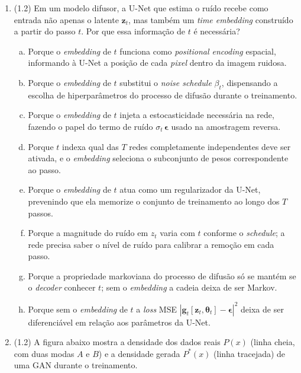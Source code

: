 \documentclass[11pt,a4paper]{article}
\newcommand{\thetav}{\boldsymbol{\theta}}
\begin{document}
\begin{enumerate}[1)]
\item (1.2) Em um modelo difusor, a U-Net que estima o ruído recebe como entrada não apenas o latente $\mathbf{z}_t$, mas também um \textit{time embedding} construído a partir do passo $t$. Por que essa informação de $t$ é necessária?
\begin{enumerate}[a)]
    \item Porque o \textit{embedding} de $t$ funciona como \textit{positional encoding} espacial, informando à U-Net a posição de cada \textit{pixel} dentro da imagem ruidosa.
    \item Porque o \textit{embedding} de $t$ substitui o \textit{noise schedule} $\beta_t$, dispensando a escolha de hiperparâmetros do processo de difusão durante o treinamento.
    \item Porque o \textit{embedding} de $t$ injeta a estocasticidade necessária na rede, fazendo o papel do termo de ruído $\sigma_t\,\boldsymbol{\epsilon}$ usado na amostragem reversa.
    \item Porque $t$ indexa qual das $T$ redes completamente independentes deve ser ativada, e o \textit{embedding} seleciona o subconjunto de pesos correspondente ao passo.
    \item Porque o \textit{embedding} de $t$ atua como um regularizador da U-Net, prevenindo que ela memorize o conjunto de treinamento ao longo dos $T$ passos.
    \item Porque a magnitude do ruído em $z_t$ varia com $t$ conforme o \textit{schedule}; a rede precisa saber o nível de ruído para calibrar a remoção em cada passo.
    \item Porque a propriedade markoviana do processo de difusão só se mantém se o \textit{decoder} conhecer $t$; sem o \textit{embedding} a cadeia deixa de ser Markov.
    \item Porque sem o \textit{embedding} de $t$ a \emph{loss} MSE $|\mathbf{g}_t[\mathbf{z}_t,\thetav_t] - \boldsymbol{\epsilon}|^{2}$ deixa de ser diferenciável em relação aos parâmetros da U-Net.
\end{enumerate}

\item (1.2) A figura abaixo mostra a densidade dos dados reais $P(x)$ (linha cheia, com duas modas $A$ e $B$) e a densidade gerada $P^{*}(x)$ (linha tracejada) de uma GAN durante o treinamento.


\end{enumerate}
\end{document}

